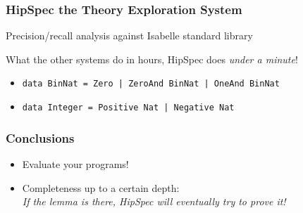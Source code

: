 \documentclass[serif,professionalfont]{beamer}
\newcommand\dn[0]{\vspace{\baselineskip}}
\newcommand\hs[1]{\texttt{#1}}
\begin{document}
\begin{frame}
  \frametitle{HipSpec the Theory Exploration System}


  Precision/recall analysis against Isabelle standard library


  \pause

  \dn

  What the other systems do in hours, HipSpec does \emph{under a minute}!

  \pause

  \dn

  \begin{itemize}
    \item \hs{data BinNat  = Zero | ZeroAnd BinNat | OneAnd BinNat}
    \pause
    \item \hs{data Integer = Positive Nat | Negative Nat}
  \end{itemize}


\end{frame}



\begin{frame}
  \frametitle{Conclusions}
  \begin{itemize}
    \item Evaluate your programs!
    \pause
    \item Completeness up to a certain depth: \\
          \emph{If the lemma is there, HipSpec will eventually try to prove it!}
  \end{itemize}
\end{frame}
\end{document}
